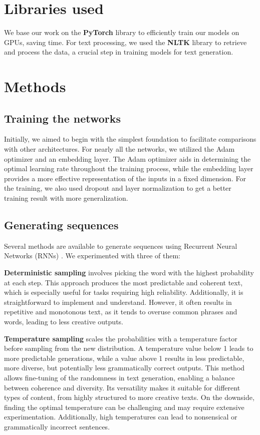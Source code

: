 \documentclass{article}
\begin{document}
\section{Libraries used}

We base our work on the \textbf{PyTorch} library to efficiently train our models on GPUs, saving time. For text processing, we used the \textbf{NLTK} library to retrieve and process the data, a crucial step in training models for text generation.

\section{Methods}

\subsection{Training the networks}

Initially, we aimed to begin with the simplest foundation to facilitate comparisons with other architectures. For nearly all the networks, we utilized the Adam optimizer \cite{kingma2017adam} and an embedding layer. The Adam optimizer aids in determining the optimal learning rate throughout the training process, while the embedding layer provides a more effective representation of the inputs in a fixed dimension.
For the training, we also used dropout and layer normalization to get a better training result with more generalization.

\subsection{Generating sequences} 

Several methods are available to generate sequences using Recurrent Neural Networks (RNNs) \cite{schmidt2019recurrent} . We experimented with three of them:

\textbf{Deterministic sampling} involves picking the word with the highest probability at each step. This approach produces the most predictable and coherent text, which is especially useful for tasks requiring high reliability. Additionally, it is straightforward to implement and understand. However, it often results in repetitive and monotonous text, as it tends to overuse common phrases and words, leading to less creative outputs.

\textbf{Temperature sampling} scales the probabilities with a temperature factor before sampling from the new distribution. A temperature value below 1 leads to more predictable generations, while a value above 1 results in less predictable, more diverse, but potentially less grammatically correct outputs. This method allows fine-tuning of the randomness in text generation, enabling a balance between coherence and diversity. Its versatility makes it suitable for different types of content, from highly structured to more creative texts. On the downside, finding the optimal temperature can be challenging and may require extensive experimentation. Additionally, high temperatures can lead to nonsensical or grammatically incorrect sentences.
\end{document}
